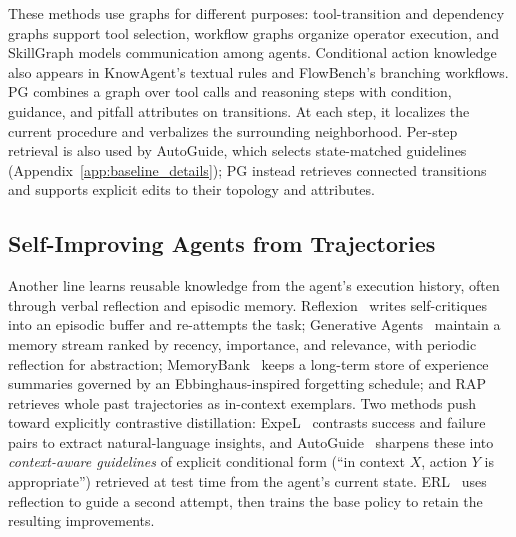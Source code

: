 These methods use graphs for different purposes: tool-transition and dependency graphs support tool selection, workflow graphs organize operator execution, and SkillGraph models communication among agents. Conditional action knowledge also appears in KnowAgent's textual rules and FlowBench's branching workflows. PG combines a graph over tool calls and reasoning steps with condition, guidance, and pitfall attributes on transitions. At each step, it localizes the current procedure and verbalizes the surrounding neighborhood. Per-step retrieval is also used by AutoGuide, which selects state-matched guidelines (Appendix~\ref{app:baseline_details}); PG instead retrieves connected transitions and supports explicit edits to their topology and attributes.

\subsection{Self-Improving Agents from Trajectories}
\label{app:trajectory-extended}

Another line learns reusable knowledge from the agent's execution history, often through verbal reflection and episodic memory. Reflexion~\citep{shinn2023reflexion} writes self-critiques into an episodic buffer and re-attempts the task; Generative Agents~\citep{park2023generative} maintain a memory stream ranked by recency, importance, and relevance, with periodic reflection for abstraction; MemoryBank~\citep{zhong2024memorybank} keeps a long-term store of experience summaries governed by an Ebbinghaus-inspired forgetting schedule; and RAP~\citep{kagaya2024rap} retrieves whole past trajectories as in-context exemplars. Two methods push toward explicitly contrastive distillation: ExpeL~\citep{zhao2024expel} contrasts success and failure pairs to extract natural-language insights, and AutoGuide~\citep{fu2024autoguide} sharpens these into \emph{context-aware guidelines} of explicit conditional form (``in context $X$, action $Y$ is appropriate'') retrieved at test time from the agent's current state. ERL~\citep{shi2026experiential} uses reflection to guide a second attempt, then trains the base policy to retain the resulting improvements.

